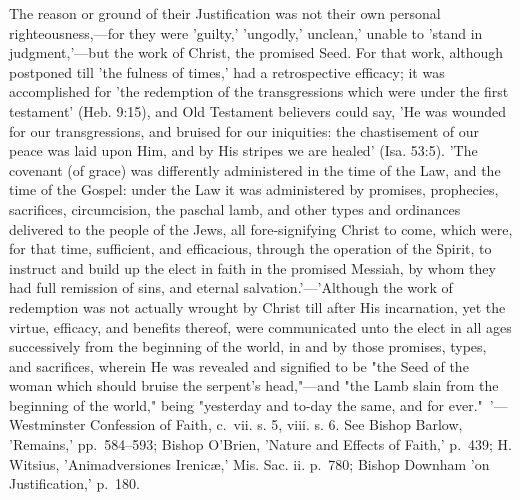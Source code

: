 \documentclass[
]{book}
\begin{document}
{  The reason or ground of their Justification was not their own personal righteousness,---for they were 'guilty,' 'ungodly,' unclean,' unable to 'stand in judgment,'---but the work of Christ, the promised Seed. For that work, although postponed till 'the fulness of times,' had a retrospective efficacy; it was accomplished for 'the redemption of the transgressions which were under the first testament' (Heb. 9:15), and Old Testament believers could say, 'He was wounded for our transgressions, and bruised for our iniquities: the chastisement of our peace was laid upon Him, and by His stripes we are healed' (Isa. 53:5). 'The covenant (of grace) was differently administered in the time of the Law, and the time of the Gospel: under the Law it was administered by promises, prophecies, sacrifices, circumcision, the paschal lamb, and other types and ordinances delivered to the people of the Jews, all fore-signifying Christ to come, which were, for that time, sufficient, and efficacious, through the operation of the Spirit, to instruct and build up the elect in faith in the promised Messiah, by whom they had full remission of sins, and eternal salvation.'---'Although the work of redemption was not actually wrought by Christ till after His incarnation, yet the virtue, efficacy, and benefits thereof, were communicated unto the elect in all ages successively from the beginning of the world, in and by those promises, types, and sacrifices, wherein He was revealed and signified to be "the Seed of the woman which should bruise the serpent's head,"---and "the Lamb slain from the beginning of the world," being "yesterday and to-day the same, and for ever."~'---Westminster Confession of Faith, c.~vii. s. 5, viii. s. 6. See Bishop Barlow, 'Remains,' pp.~584--593; Bishop O'Brien, 'Nature and Effects of Faith,' p.~439; H. Witsius, 'Animadversiones Irenicæ,' Mis. Sac. ii. p.~780; Bishop Downham 'on Justification,' p.~180.

}
\end{document}
